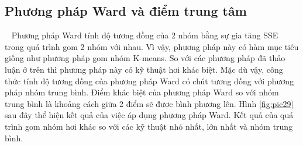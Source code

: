 \subsection{Phương pháp Ward và điểm trung tâm}
~\cite{Vipin-Kumar, AHC, hierarchical-clustering} Phương pháp Ward tính độ tương đồng của 2 nhóm bằng sự gia tăng SSE trong quá trình gom 2 nhóm với nhau.
Vì vậy, phương pháp này có hàm mục tiêu giống như phương pháp gom nhóm K-means.
So với các phương pháp đã thảo luận ở trên thì phương pháp này có kỹ thuật hơi khác biệt.
Mặc dù vậy, công thức tính độ tương đồng của phương pháp Ward có chút tương đồng với phương pháp nhóm trung bình.
Điểm khác biệt của phương pháp Ward so với nhóm trung bình là khoảng cách giữa 2 điểm sẽ được bình phương lên.
Hình \ref{fig:pic29} sau đây thể hiện kết quả của việc áp dụng phương pháp Ward. Kết quả của quá trình gom nhóm hơi khác so với các kỹ thuật nhỏ nhất, lớn nhất và nhóm trung bình.

